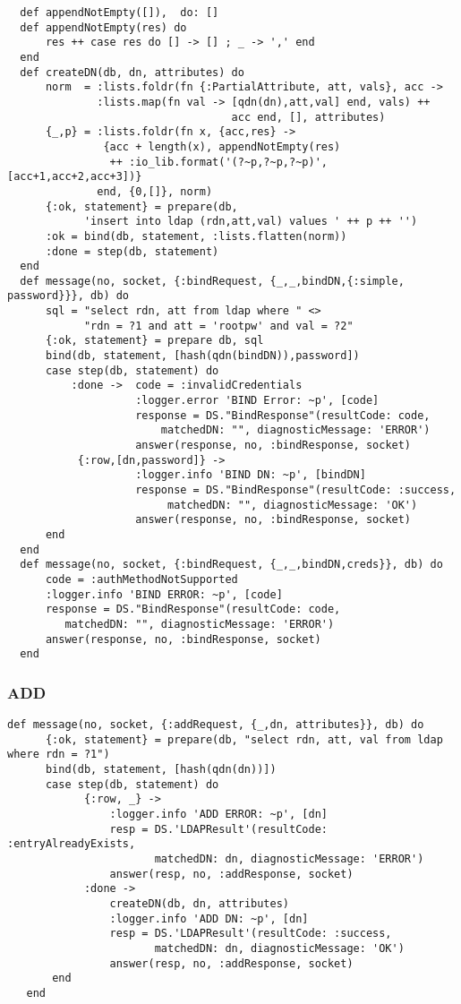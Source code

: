 \begin{lstlisting}
  def appendNotEmpty([]),  do: []
  def appendNotEmpty(res) do
      res ++ case res do [] -> [] ; _ -> ',' end
  end
  def createDN(db, dn, attributes) do
      norm  = :lists.foldr(fn {:PartialAttribute, att, vals}, acc ->
              :lists.map(fn val -> [qdn(dn),att,val] end, vals) ++
                                   acc end, [], attributes)
      {_,p} = :lists.foldr(fn x, {acc,res} ->
               {acc + length(x), appendNotEmpty(res)
                ++ :io_lib.format('(?~p,?~p,?~p)', [acc+1,acc+2,acc+3])}
              end, {0,[]}, norm)
      {:ok, statement} = prepare(db,
            'insert into ldap (rdn,att,val) values ' ++ p ++ '')
      :ok = bind(db, statement, :lists.flatten(norm))
      :done = step(db, statement)
  end
  def message(no, socket, {:bindRequest, {_,_,bindDN,{:simple, password}}}, db) do
      sql = "select rdn, att from ldap where " <>
            "rdn = ?1 and att = 'rootpw' and val = ?2"
      {:ok, statement} = prepare db, sql
      bind(db, statement, [hash(qdn(bindDN)),password])
      case step(db, statement) do
          :done ->  code = :invalidCredentials
                    :logger.error 'BIND Error: ~p', [code]
                    response = DS."BindResponse"(resultCode: code,
                        matchedDN: "", diagnosticMessage: 'ERROR')
                    answer(response, no, :bindResponse, socket)
           {:row,[dn,password]} ->
                    :logger.info 'BIND DN: ~p', [bindDN]
                    response = DS."BindResponse"(resultCode: :success,
                         matchedDN: "", diagnosticMessage: 'OK')
                    answer(response, no, :bindResponse, socket)
      end
  end
  def message(no, socket, {:bindRequest, {_,_,bindDN,creds}}, db) do
      code = :authMethodNotSupported
      :logger.info 'BIND ERROR: ~p', [code]
      response = DS."BindResponse"(resultCode: code,
         matchedDN: "", diagnosticMessage: 'ERROR')
      answer(response, no, :bindResponse, socket)
  end
\end{lstlisting}

\newpage
\subsubsection{ADD}

\begin{lstlisting}
def message(no, socket, {:addRequest, {_,dn, attributes}}, db) do
      {:ok, statement} = prepare(db, "select rdn, att, val from ldap where rdn = ?1")
      bind(db, statement, [hash(qdn(dn))])
      case step(db, statement) do
            {:row, _} ->
                :logger.info 'ADD ERROR: ~p', [dn]
                resp = DS.'LDAPResult'(resultCode: :entryAlreadyExists,
                       matchedDN: dn, diagnosticMessage: 'ERROR')
                answer(resp, no, :addResponse, socket)
            :done ->
                createDN(db, dn, attributes)
                :logger.info 'ADD DN: ~p', [dn]
                resp = DS.'LDAPResult'(resultCode: :success,
                       matchedDN: dn, diagnosticMessage: 'OK')
                answer(resp, no, :addResponse, socket)
       end
   end
\end{lstlisting}

